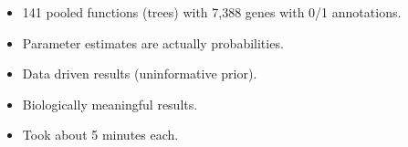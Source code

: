 \documentclass[aspectratio=169, 9pt]{beamer}\usepackage[]{graphicx}\usepackage[]{color}
\begin{document}
\begin{frame}[t]
\begin{minipage}{.39\linewidth}
\begin{table}[ht]
\centering
{}
\caption{Parameter estimates using different priors.} 
\end{table}
%
\end{minipage}
\begin{minipage}{.59\linewidth}
\begin{itemize}[<+->]
\item 141 pooled functions (trees) with 7,388 genes with 0/1 annotations.
\item Parameter estimates are actually probabilities.
\item Data driven results (uninformative prior).
\item \textcolor{usccardinal}{Biologically meaningful results.}
\item Took about 5 minutes each.
\end{itemize}
\end{minipage}

\end{frame}
\end{document}
